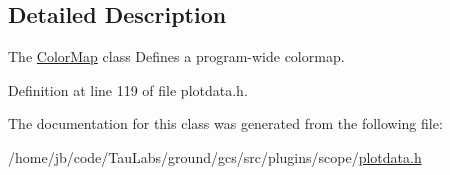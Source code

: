\subsection{\-Detailed \-Description}
\-The \hyperlink{class_color_map}{\-Color\-Map} class \-Defines a program-\/wide colormap. 

\-Definition at line 119 of file plotdata.\-h.



\-The documentation for this class was generated from the following file\-:\begin{DoxyCompactItemize}
\item 
/home/jb/code/\-Tau\-Labs/ground/gcs/src/plugins/scope/\hyperlink{plotdata_8h}{plotdata.\-h}\end{DoxyCompactItemize}
